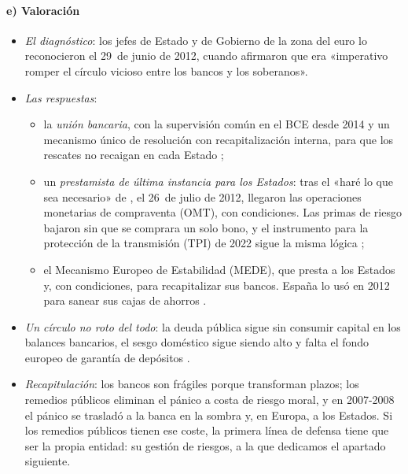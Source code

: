 \documentclass[11pt]{article}
\begin{document}
\paragraph{e) Valoración}

\begin{itemize}
\item \emph{El diagnóstico}: los jefes de Estado y de Gobierno de la zona del euro lo reconocieron el 29~de junio de 2012, cuando afirmaron que era «imperativo romper el círculo vicioso entre los bancos y los soberanos»\nocite{EuroCumbre2012}.
\item \emph{Las respuestas}:
  \begin{itemize}
  \item la \emph{unión bancaria}, con la supervisión común en el BCE desde 2014\nocite{RegUE2013MUS} y un mecanismo único de resolución con recapitalización interna, para que los rescates no recaigan en cada Estado ;
  \item un \emph{prestamista de última instancia para los Estados}: tras el «haré lo que sea necesario» de , el 26~de julio de 2012, llegaron las operaciones monetarias de compraventa (OMT), con condiciones. Las primas de riesgo bajaron sin que se comprara un solo bono, y el instrumento para la protección de la transmisión (TPI) de 2022 sigue la misma lógica\nocite{Draghi2012Speech,BCE2012OMT,BCE2022TPI} ;
  \item el Mecanismo Europeo de Estabilidad (MEDE), que presta a los Estados y, con condiciones, para recapitalizar sus bancos. España lo usó en 2012 para sanear sus cajas de ahorros\nocite{MEDE2026Espana} .
  \end{itemize}
\item \emph{Un círculo no roto del todo}: la deuda pública sigue sin consumir capital en los balances bancarios, el sesgo doméstico sigue siendo alto y falta el fondo europeo de garantía de depósitos  .
\end{itemize}

\begin{itemize}
\item \emph{Recapitulación}: los bancos son frágiles porque transforman plazos; los remedios públicos eliminan el pánico a costa de riesgo moral, y en 2007-2008 el pánico se trasladó a la banca en la sombra y, en Europa, a los Estados. Si los remedios públicos tienen ese coste, la primera línea de defensa tiene que ser la propia entidad: su gestión de riesgos, a la que dedicamos el apartado siguiente.
\end{itemize}
\end{document}

